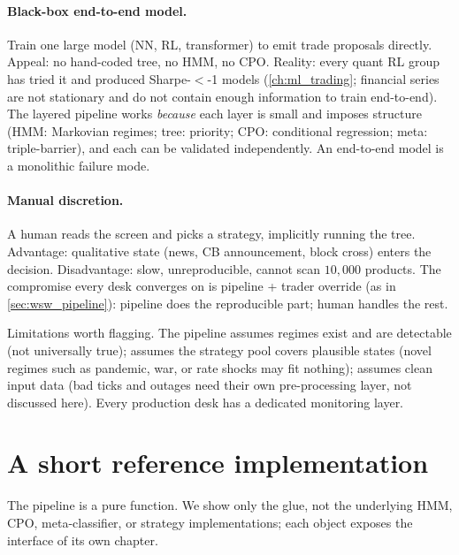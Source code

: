 \paragraph{Black-box end-to-end model.} Train one large model (NN,
RL, transformer) to emit trade proposals directly. Appeal: no
hand-coded tree, no HMM, no CPO. Reality: every quant RL group has
tried it and produced Sharpe-$<$-1 models (\cref{ch:ml_trading};
financial series are not stationary and do not contain enough
information to train end-to-end). The layered pipeline works
\emph{because} each layer is small and imposes structure (HMM:
Markovian regimes; tree: priority; CPO: conditional regression;
meta: triple-barrier), and each can be validated independently. An
end-to-end model is a monolithic failure mode.

\paragraph{Manual discretion.} A human reads the screen and picks a
strategy, implicitly running the tree. Advantage: qualitative
state (news, CB announcement, block cross) enters the decision.
Disadvantage: slow, unreproducible, cannot scan $10{,}000$
products. The compromise every desk converges on is pipeline +
trader override (as in \cref{sec:wsw_pipeline}): pipeline does the
reproducible part; human handles the rest.

Limitations worth flagging. The pipeline assumes regimes exist
and are detectable (not universally true); assumes the strategy
pool covers plausible states (novel regimes such as pandemic, war,
or rate shocks may fit nothing); assumes clean input data (bad
ticks and outages need their own pre-processing layer, not
discussed here). Every production desk has a dedicated monitoring
layer.

\section{A short reference implementation}
\label{sec:wsw_code}

The pipeline is a pure function. We show only the glue, not the
underlying HMM, CPO, meta-classifier, or strategy implementations;
each object exposes the interface of its own chapter.

